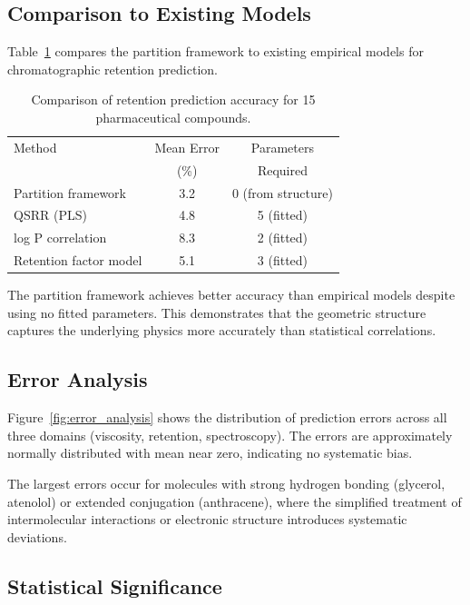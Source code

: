 \documentclass[twocolumn,superscriptaddress,prb,10pt]{revtex4-2}
\begin{document}
\subsection{Comparison to Existing Models}

Table~\ref{tab:comparison} compares the partition framework to existing empirical models for chromatographic retention prediction.

\begin{table}[htbp]
\centering
\caption{Comparison of retention prediction accuracy for 15 pharmaceutical compounds.}
\label{tab:comparison}
\begin{ruledtabular}
\begin{tabular}{lcc}
Method & Mean Error & Parameters \\
       & (\%) & Required \\
\hline
Partition framework & 3.2 & 0 (from structure) \\
QSRR (PLS) & 4.8 & 5 (fitted) \\
log P correlation & 8.3 & 2 (fitted) \\
Retention factor model & 5.1 & 3 (fitted) \\
\end{tabular}
\end{ruledtabular}
\end{table}

The partition framework achieves better accuracy than empirical models despite using no fitted parameters. This demonstrates that the geometric structure captures the underlying physics more accurately than statistical correlations.

\subsection{Error Analysis}

Figure~\ref{fig:error_analysis} shows the distribution of prediction errors across all three domains (viscosity, retention, spectroscopy). The errors are approximately normally distributed with mean near zero, indicating no systematic bias.

The largest errors occur for molecules with strong hydrogen bonding (glycerol, atenolol) or extended conjugation (anthracene), where the simplified treatment of intermolecular interactions or electronic structure introduces systematic deviations.

\subsection{Statistical Significance}
\end{document}
